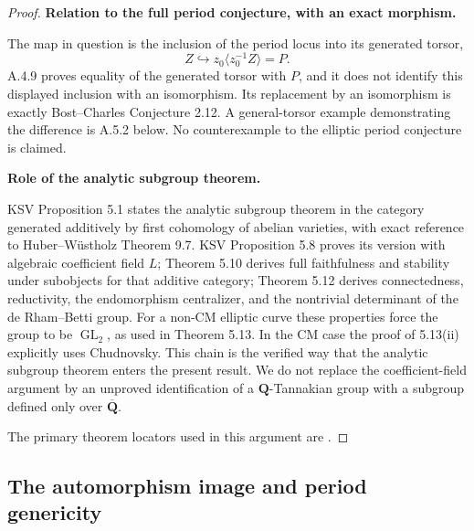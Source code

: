 \begin{proof}
\textbf{Relation to the full period conjecture, with an exact morphism.}

The map in question is the inclusion of the period locus into its
generated torsor,
\[
Z\hookrightarrow z_0\langle z_0^{-1}Z\rangle=P.
\]
A.4.9 proves equality of the generated torsor with \(P\), and it does not
identify this displayed inclusion with an isomorphism. Its replacement by
an isomorphism is exactly Bost--Charles Conjecture 2.12. A general-torsor
example demonstrating the difference is A.5.2 below. No counterexample to
the elliptic period conjecture is claimed.

\textbf{Role of the analytic subgroup theorem.}

KSV Proposition 5.1 states the analytic subgroup theorem in the category
generated additively by first cohomology of abelian varieties, with exact
reference to Huber--Wüstholz Theorem 9.7. KSV Proposition 5.8 proves its
version with algebraic coefficient field \(L\); Theorem 5.10 derives full
faithfulness and stability under subobjects for that additive category;
Theorem 5.12 derives connectedness, reductivity, the endomorphism
centralizer, and the nontrivial determinant of the de Rham--Betti group.
For a non-CM elliptic curve these properties force the group to be
\(\operatorname{GL}_2\), as used in Theorem 5.13. In the CM case the proof
of 5.13(ii) explicitly uses Chudnovsky. This chain is the verified way that
the analytic subgroup theorem enters the present result. We do not replace
the coefficient-field argument by an unproved identification of a
\(\mathbf Q\)-Tannakian group with a subgroup defined only over
\(\overline{\mathbf Q}\).

The primary theorem locators used in this argument are \cite[Proposition 3.1; Theorem 5.13(ii); Proposition 5.14]{GenKSV2026}.
\end{proof}

\subsection{The automorphism image and period genericity}

